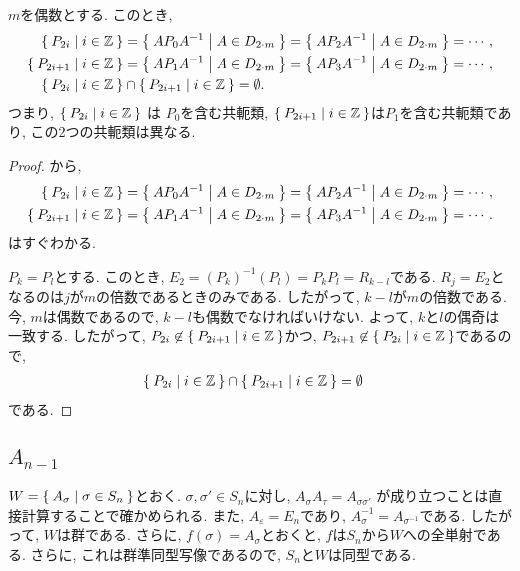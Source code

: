 \begin{prop}
  \label{lem:i2m:conjclass:even}
  $m$を偶数とする.
  このとき,
  \begin{align*}
    \Set{P_{2i}|i\in\mathbb{Z}}&=\Set{AP_0A^{-1} | A \in D_{2\cdot m}}=\Set{AP_2A^{-1} | A \in D_{2\cdot m}}=\cdots,\\
    \Set{P_{2i+1}|i\in\mathbb{Z}}&=\Set{AP_1A^{-1} | A \in D_{2\cdot m}}=\Set{AP_3A^{-1} | A \in D_{2\cdot m}}=\cdots,\\
    \Set{P_{2i}|i\in\mathbb{Z}}&\cap \Set{P_{2i+1}|i\in\mathbb{Z}} =\emptyset.
  \end{align*}
つまり, 
$\Set{P_{2i}|i\in\mathbb{Z}}$ は $P_0$を含む共軛類,
$\Set{P_{2i+1}|i\in\mathbb{Z}}$は$P_1$を含む共軛類であり,
この2つの共軛類は異なる.
\end{prop}
\begin{proof}
  から,
  \begin{align*}
    \Set{P_{2i}|i\in\mathbb{Z}}&=\Set{AP_0A^{-1} | A \in D_{2\cdot m}}=\Set{AP_2A^{-1} | A \in D_{2\cdot m}}=\cdots,\\
    \Set{P_{2i+1}|i\in\mathbb{Z}}&=\Set{AP_1A^{-1} | A \in D_{2\cdot m}}=\Set{AP_3A^{-1} | A \in D_{2\cdot m}}=\cdots.
  \end{align*}
  はすぐわかる.

  $P_{k}=P_{l}$とする.
  このとき, $E_{2}=(P_{k})^{-1}(P_{l})=P_{k}P_{l}=R_{k-l}$である.
  $R_{j}=E_2$となるのは$j$が$m$の倍数であるときのみである.
  したがって, $k-l$が$m$の倍数である.
  今, $m$は偶数であるので, $k-l$も偶数でなければいけない.
  よって, $k$と$l$の偶奇は一致する.
  したがって, $P_{2i}\not\in\Set{P_{2i+1}|i\in\mathbb{Z}}$かつ,
  $P_{2i+1}\not\in\Set{P_{2i}|i\in\mathbb{Z}}$であるので,
\begin{align*}
    \Set{P_{2i}|i\in\mathbb{Z}}&\cap \Set{P_{2i+1}|i\in\mathbb{Z}} =\emptyset
  \end{align*}
  である.
\end{proof}

\subsection{$A_{n-1}$}
\label{ex:an:grp}
$W=\Set{A_\sigma|\sigma\in S_n}$とおく.
$\sigma,\sigma' \in S_n$に対し,
$A_\sigma A_\tau=A_{\sigma\sigma'}$
が成り立つことは直接計算することで確かめられる.
また,
$A_{\varepsilon}=E_n$であり,
$A_\sigma^{-1}=A_{\sigma^{-1}}$である.
したがって, $W$は群である.
さらに,
$f(\sigma)=A_\sigma$とおくと,
$f$は$S_n$から$W$への全単射である.
さらに, これは群準同型写像であるので,
$S_n$と$W$は同型である.


